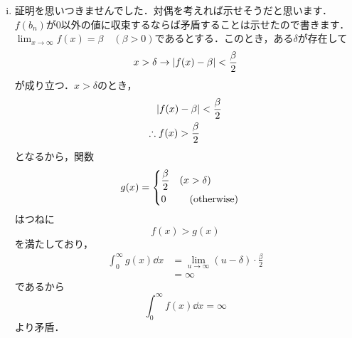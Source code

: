 \begin{enumerate}[(1)]
\begin{enumerate}[(i)]
\begin{figure}[H]
        \end{figure}
        \item {\color{blue} 証明を思いつきませんでした．対偶を考えれば示せそうだと思います．$f(b_n)$が0以外の値に収束するならば矛盾することは示せたので書きます．}\\
        $\displaystyle\lim_{x\to \infty}f(x)=\beta\quad(\beta>0)$であるとする．このとき，ある$\delta$が存在して
        \begin{equation}
            x>\delta\to \abs{f(x)-\beta}<\frac{\beta}{2}
        \end{equation}
        が成り立つ．$x>\delta$のとき，
        \begin{align}
            \abs{f(x)-\beta}&<\frac{\beta}{2}\\
            \therefore f(x)>\frac{\beta}{2}
        \end{align}
        となるから，関数
        \begin{equation}
            g(x)=
            \begin{dcases}
                \dfrac{\beta}{2}&(x>\delta)\\
                0&\qq{(otherwise)}
            \end{dcases}
        \end{equation}
        はつねに
        \begin{equation}
            f(x)>g(x)
        \end{equation}
        を満たしており，
        \begin{align}
            \int_0^\infty g(x)\dd{x}
            &=\lim_{u\to\infty}(u-\delta)\cdot\frac{\beta}{2}\\
            &=\infty
        \end{align}
        であるから
        \begin{equation}
            \int_0^\infty f(x)\dd{x}=\infty
        \end{equation}
        より矛盾．
    \end{enumerate}
\end{enumerate}

